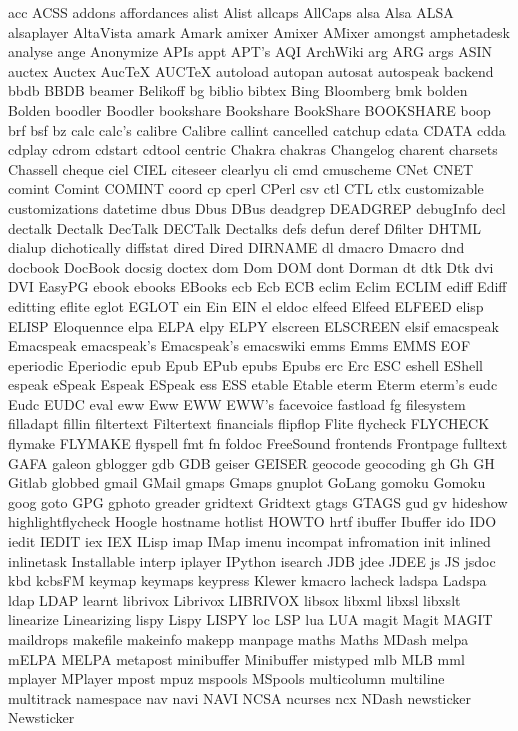 acc
ACSS
addons
affordances
alist
Alist
allcaps
AllCaps
alsa
Alsa
ALSA
alsaplayer
AltaVista
amark
Amark
amixer
Amixer
AMixer
amongst
amphetadesk
analyse
ange
Anonymize
APIs
appt
APT's
AQI
ArchWiki
arg
ARG
args
ASIN
auctex
Auctex
AucTeX
AUCTeX
autoload
autopan
autosat
autospeak
backend
bbdb
BBDB
beamer
Belikoff
bg
biblio
bibtex
Bing
Bloomberg
bmk
bolden
Bolden
boodler
Boodler
bookshare
Bookshare
BookShare
BOOKSHARE
boop
brf
bsf
bz
calc
calc's
calibre
Calibre
callint
cancelled
catchup
cdata
CDATA
cdda
cdplay
cdrom
cdstart
cdtool
centric
Chakra
chakras
Changelog
charent
charsets
Chassell
cheque
ciel
CIEL
citeseer
clearlyu
cli
cmd
cmuscheme
CNet
CNET
comint
Comint
COMINT
coord
cp
cperl
CPerl
csv
ctl
CTL
ctlx
customizable
customizations
datetime
dbus
Dbus
DBus
deadgrep
DEADGREP
debugInfo
decl
dectalk
Dectalk
DecTalk
DECTalk
Dectalks
defs
defun
deref
Dfilter
DHTML
dialup
dichotically
diffstat
dired
Dired
DIRNAME
dl
dmacro
Dmacro
dnd
docbook
DocBook
docsig
doctex
dom
Dom
DOM
dont
Dorman
dt
dtk
Dtk
dvi
DVI
EasyPG
ebook
ebooks
EBooks
ecb
Ecb
ECB
eclim
Eclim
ECLIM
ediff
Ediff
editting
eflite
eglot
EGLOT
ein
Ein
EIN
el
eldoc
elfeed
Elfeed
ELFEED
elisp
ELISP
Eloquennce
elpa
ELPA
elpy
ELPY
elscreen
ELSCREEN
elsif
emacspeak
Emacspeak
emacspeak's
Emacspeak's
emacswiki
emms
Emms
EMMS
EOF
eperiodic
Eperiodic
epub
Epub
EPub
epubs
Epubs
erc
Erc
ESC
eshell
EShell
espeak
eSpeak
Espeak
ESpeak
ess
ESS
etable
Etable
eterm
Eterm
eterm's
eudc
Eudc
EUDC
eval
eww
Eww
EWW
EWW's
facevoice
fastload
fg
filesystem
filladapt
fillin
filtertext
Filtertext
financials
flipflop
Flite
flycheck
FLYCHECK
flymake
FLYMAKE
flyspell
fmt
fn
foldoc
FreeSound
frontends
Frontpage
fulltext
GAFA
galeon
gblogger
gdb
GDB
geiser
GEISER
geocode
geocoding
gh
Gh
GH
Gitlab
globbed
gmail
GMail
gmaps
Gmaps
gnuplot
GoLang
gomoku
Gomoku
goog
goto
GPG
gphoto
greader
gridtext
Gridtext
gtags
GTAGS
gud
gv
hideshow
highlightflycheck
Hoogle
hostname
hotlist
HOWTO
hrtf
ibuffer
Ibuffer
ido
IDO
iedit
IEDIT
iex
IEX
ILisp
imap
IMap
imenu
incompat
infromation
init
inlined
inlinetask
Installable
interp
iplayer
IPython
isearch
JDB
jdee
JDEE
js
JS
jsdoc
kbd
kcbsFM
keymap
keymaps
keypress
Klewer
kmacro
lacheck
ladspa
Ladspa
ldap
LDAP
learnt
librivox
Librivox
LIBRIVOX
libsox
libxml
libxsl
libxslt
linearize
Linearizing
lispy
Lispy
LISPY
loc
LSP
lua
LUA
magit
Magit
MAGIT
maildrops
makefile
makeinfo
makepp
manpage
maths
Maths
MDash
melpa
mELPA
MELPA
metapost
minibuffer
Minibuffer
mistyped
mlb
MLB
mml
mplayer
MPlayer
mpost
mpuz
mspools
MSpools
multicolumn
multiline
multitrack
namespace
nav
navi
NAVI
NCSA
ncurses
ncx
NDash
newsticker
Newsticker
